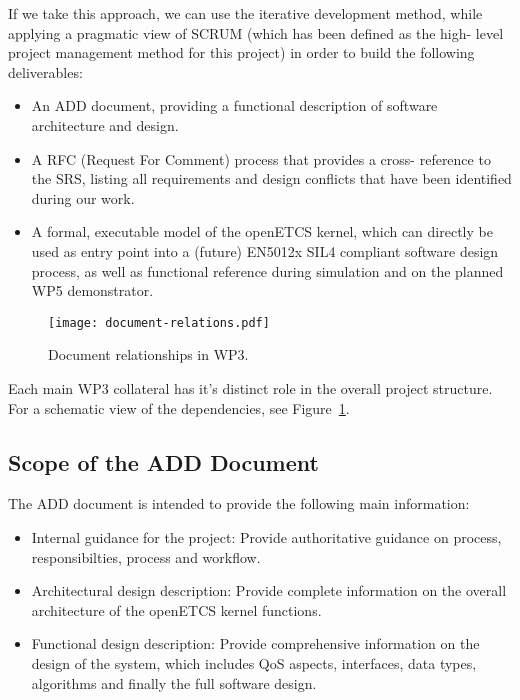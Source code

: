 If we take this approach, we can use the iterative development method, while applying a pragmatic view of SCRUM (which has been defined as the high- level project management method for this project) in order to build the following deliverables:

\begin{itemize}
\item An ADD document, providing a functional description of software architecture and design.
 
\item A RFC (Request For Comment) process that provides a cross- reference to the SRS, listing all requirements and design conflicts that have been identified during our work.
 
\item A formal, executable model of the openETCS kernel, which can directly be used as entry point into a (future) EN5012x SIL4 compliant software design process, as well as functional reference during simulation and on the planned WP5 demonstrator.
\end{itemize}
 
\begin{figure}
\centering
\texttt{[image: document-relations.pdf]}
\caption{Document relationships in WP3.}
\label{fig:doc-rels}
\end{figure}

Each main WP3 collateral has it's distinct role in the overall project structure. For a schematic view of the dependencies, see Figure~\ref{fig:doc-rels}.


\subsection{Scope of the ADD Document}
 
The ADD document is intended to provide the following main information:

\begin{itemize}
\item Internal guidance for the project: Provide authoritative guidance on process, responsibilties, process and workflow.
 
\item Architectural design description: Provide complete information on the overall architecture of the openETCS kernel functions.

\item Functional design description: Provide comprehensive information on the design of the system, which includes QoS aspects, interfaces, data types, algorithms and finally the full software design.
\end{itemize}

